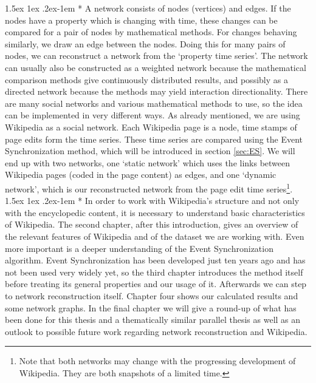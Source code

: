 \documentclass[a4paper,12pt,twoside]{article}
\makeatletter
\renewcommand{\paragraph}{%
  \@startsection{paragraph}{4}%
  {\z@}{1.5ex \@plus 1ex \@minus .2ex}{-1em}%
  {\normalfont\normalsize\bfseries}%
}
\makeatother
\begin{document}
\paragraph*{} A network consists of nodes (vertices) and edges. If the nodes have a property which is changing with time, these changes can be compared for a pair of nodes by mathematical methods. For changes behaving similarly, we draw an edge between the nodes. Doing this for many pairs of nodes, we can reconstruct a network from the `property time series'. The network can usually also be constructed as a weighted network because the mathematical comparison methods give continuously distributed results, and possibly as a directed network because the methods may yield interaction directionality. There are many social networks and various mathematical methods to use, so the idea can be implemented in very different ways. As already mentioned, we are using Wikipedia as a social network. Each Wikipedia page is a node, time stamps of page edits form the time series. These time series are compared using the Event Synchronization method, which will be introduced in section \ref{sec:ES}. We will end up with two networks, one `static network' which uses the links between Wikipedia pages (coded in the page content) as edges, and one `dynamic network', which is our reconstructed network from the page edit time series\footnote{Note that both networks may change with the progressing development of Wikipedia. They are both snapshots of a limited time.}.
\paragraph*{} In order to work with Wikipedia's structure and not only with the encyclopedic content, it is necessary to understand basic characteristics of Wikipedia. The second chapter, after this introduction, gives an overview of the relevant features of Wikipedia and of the dataset we are working with. Even more important is a deeper understanding of the Event Synchronization algorithm. Event Synchronization has been developed just ten years ago and has not been used very widely yet, so the third chapter introduces the method itself before treating its general properties and our usage of it. Afterwards we can step to network reconstruction itself. Chapter four shows our calculated results and some network graphs. In the final chapter we will give a round-up of what has been done for this thesis and a thematically similar parallel thesis as well as an outlook to possible future work regarding network reconstruction and Wikipedia.
\newpage
%
\end{document}

